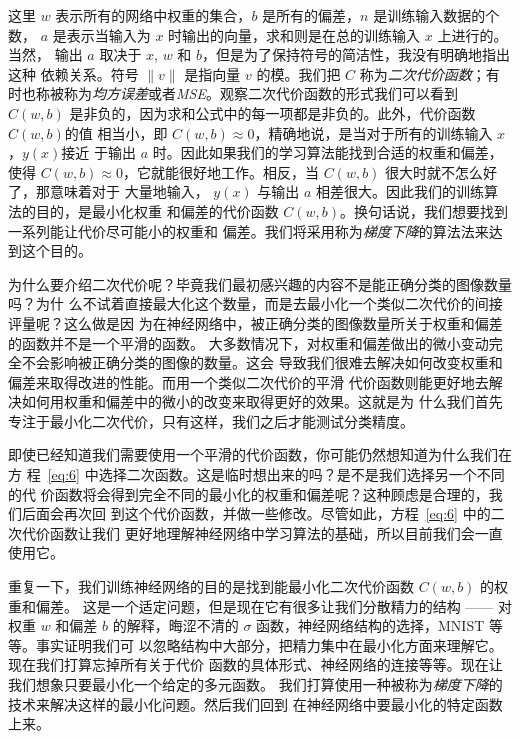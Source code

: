 这里 $w$ 表示所有的网络中权重的集合，$b$ 是所有的偏差，$n$ 是训练输入数据的个数，
$a$ 是表示当输入为 $x$ 时输出的向量，求和则是在总的训练输入 $x$ 上进行的。当然，
输出 $a$ 取决于 $x$, $w$ 和 $b$，但是为了保持符号的简洁性，我没有明确地指出这种
依赖关系。符号 $\|v\|$ 是指向量 $v$ 的模。我们把 $C$ 称为\emph{二次代价函数}；有
时也称被称为\emph{均方误差}或者\emph{MSE}。观察二次代价函数的形式我们可以看到
$C(w,b)$ 是非负的，因为求和公式中的每一项都是非负的。此外，代价函数 $C(w,b)$的值
相当小，即 $C(w,b) \approx 0$，精确地说，是当对于所有的训练输入 $x$，$y(x)$接近
于输出 $a$ 时。因此如果我们的学习算法能找到合适的权重和偏差，使得 $C(w,b)
\approx 0$，它就能很好地工作。相反，当 $C(w,b)$ 很大时就不怎么好了，那意味着对于
大量地输入， $y(x)$ 与输出 $a$ 相差很大。因此我们的训练算法的目的，是最小化权重
和偏差的代价函数 $C(w,b)$。换句话说，我们想要找到一系列能让代价尽可能小的权重和
偏差。我们将采用称为\emph{梯度下降}的算法法来达到这个目的。

为什么要介绍二次代价呢？毕竟我们最初感兴趣的内容不是能正确分类的图像数量吗？为什
么不试着直接最大化这个数量，而是去最小化一个类似二次代价的间接评量呢？这么做是因
为在神经网络中，被正确分类的图像数量所关于权重和偏差的函数并不是一个平滑的函数。
大多数情况下，对权重和偏差做出的微小变动完全不会影响被正确分类的图像的数量。这会
导致我们很难去解决如何改变权重和偏差来取得改进的性能。而用一个类似二次代价的平滑
代价函数则能更好地去解决如何用权重和偏差中的微小的改变来取得更好的效果。这就是为
什么我们首先专注于最小化二次代价，只有这样，我们之后才能测试分类精度。

即使已经知道我们需要使用一个平滑的代价函数，你可能仍然想知道为什么我们在方
程~\eqref{eq:6} 中选择二次函数。这是临时想出来的吗？是不是我们选择另一个不同的代
价函数将会得到完全不同的最小化的权重和偏差呢？这种顾虑是合理的，我们后面会再次回
到这个代价函数，并做一些修改。尽管如此，方程~\eqref{eq:6} 中的二次代价函数让我们
更好地理解神经网络中学习算法的基础，所以目前我们会一直使用它。

重复一下，我们训练神经网络的目的是找到能最小化二次代价函数 $C(w,b)$ 的权重和偏差。
这是一个适定问题，但是现在它有很多让我们分散精力的结构 —— 对权重 $w$ 和偏差 $b$
的解释，晦涩不清的 $\sigma$ 函数，神经网络结构的选择，MNIST 等等。事实证明我们可
以忽略结构中大部分，把精力集中在最小化方面来理解它。现在我们打算忘掉所有关于代价
函数的具体形式、神经网络的连接等等。现在让我们想象只要最小化一个给定的多元函数。
我们打算使用一种被称为\emph{梯度下降}的技术来解决这样的最小化问题。然后我们回到
在神经网络中要最小化的特定函数上来。

